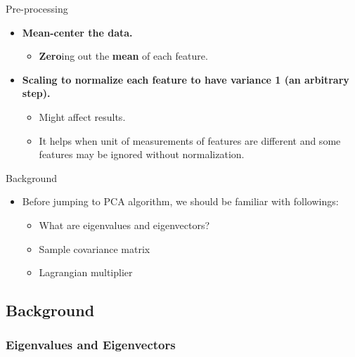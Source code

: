 \documentclass[serif, aspectratio=169]{beamer}
\begin{document}
\begin{frame}{Pre-processing}
    \begin{itemize}
        \item \textbf{Mean-center the data.}
            \begin{itemize}
                \item \textbf{Zero}ing out the \textbf{mean} of each feature.\\
            \end{itemize}
            
        \item \textbf{Scaling to normalize each feature to have variance 1 (an arbitrary step).}
            \begin{itemize}
                \item Might affect results.
                \item It helps when unit of measurements of features are different and some features may be ignored without normalization.
            \end{itemize}
    \end{itemize}
\end{frame}

\begin{frame}{Background}
    \begin{itemize}
        \item Before jumping to PCA algorithm, we should be familiar with followings:
        \begin{itemize}
            \item What are eigenvalues and eigenvectors?
            \item Sample covariance matrix
            \item Lagrangian multiplier
        \end{itemize}
    \end{itemize}
\end{frame}

\subsection{Background}

\subsubsection{Eigenvalues and Eigenvectors}
\end{document}
